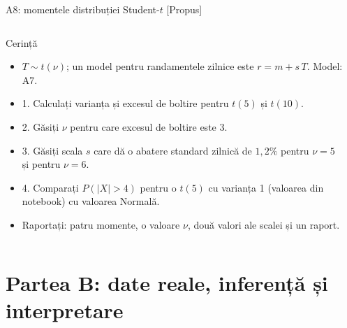\begin{frame}{A8: momentele distribuției Student-$t$ [Propus]}
\propsub
\itemsize{\scriptsize}
\begin{columns}[T]
\begin{column}{\taskw}
\begin{block}{Cerință}
\begin{itemize}
    \item $T \sim t(\nu)$; un model pentru randamentele zilnice este $r = m + s\,T$. Model: A7.
    \item 1. Calculați varianța și excesul de boltire pentru $t(5)$ și $t(10)$.
    \item 2. Găsiți $\nu$ pentru care excesul de boltire este 3.
    \item 3. Găsiți scala $s$ care dă o abatere standard zilnică de $1{,}2\%$ pentru $\nu = 5$ și pentru $\nu = 6$.
    \item 4. Comparați $P(|X| > 4)$ pentru o $t(5)$ cu varianța 1 (valoarea din notebook) cu valoarea Normală.
    \item Raportați: patru momente, o valoare $\nu$, două valori ale scalei și un raport.
\end{itemize}
\end{block}
\end{column}
\begin{column}{\solw}
\end{column}
\end{columns}
\end{frame}


\section{Partea B: date reale, inferență și interpretare}

